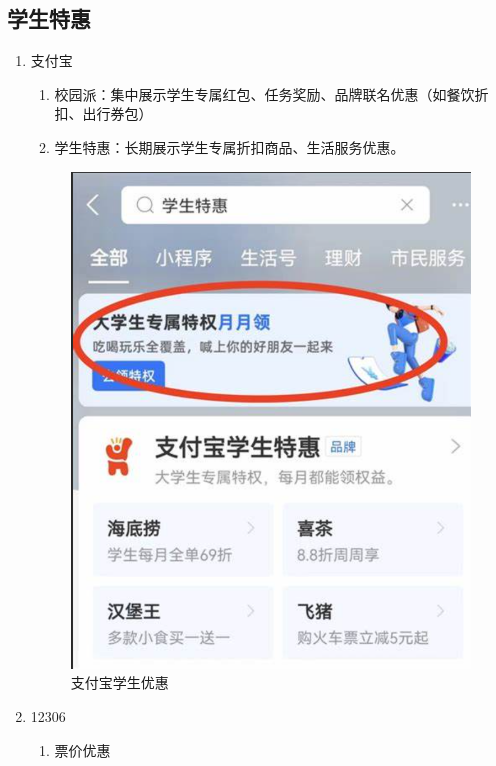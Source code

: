 \documentclass{amznotes}
\begin{document}
\subsection{学生特惠}
\begin{enumerate}
  \item 支付宝
  \begin{enumerate}
    \item 校园派：集中展示学生专属红包、任务奖励、品牌联名优惠（如餐饮折扣、出行券包）
    \item 学生特惠：长期展示学生专属折扣商品、生活服务优惠。
  \end{enumerate}
  \begin{figure}[H]
    \centering
    \includegraphics[width=.8\textwidth]{./figures/生活/学生优惠_支付宝.png}
    \caption{支付宝学生优惠}
  \end{figure}
  \item 12306
  \begin{enumerate}
    \item 票价优惠
  \end{enumerate}
  \begin{figure}[H]
    \centering

\end{figure}
\end{enumerate}
\end{document}
